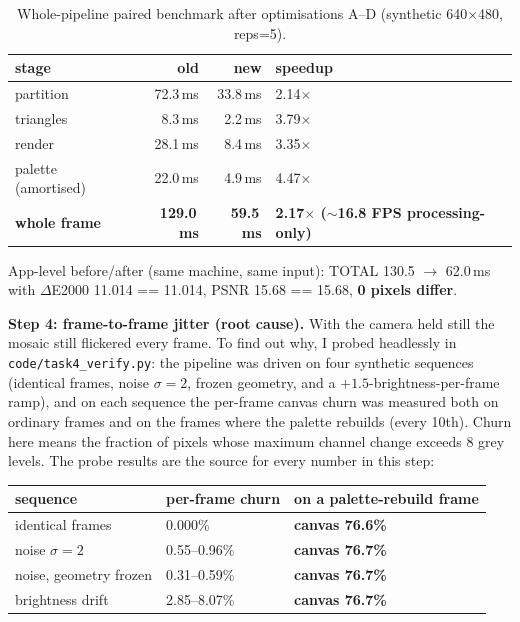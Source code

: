 \documentclass[11pt,a4paper]{article}
\begin{document}
\begin{table}[htbp]
\centering
\begin{tabular}{@{}l r r l@{}}
\toprule
\textbf{stage} & \textbf{old} & \textbf{new} & \textbf{speedup}\\
\midrule
partition           & 72.3\,ms & 33.8\,ms & 2.14$\times$ \\
triangles           & 8.3\,ms  & 2.2\,ms  & 3.79$\times$ \\
render              & 28.1\,ms & 8.4\,ms  & 3.35$\times$ \\
palette (amortised) & 22.0\,ms & 4.9\,ms  & 4.47$\times$ \\
\midrule
\textbf{whole frame} & \textbf{129.0\,ms} & \textbf{59.5\,ms} & \textbf{2.17$\times$ ($\sim$16.8 FPS processing-only)} \\
\bottomrule
\end{tabular}
\caption{Whole-pipeline paired benchmark after optimisations A--D (synthetic
640$\times$480, reps=5).}
\label{tab:pipeline}
\end{table}

App-level before/after (same machine, same input): TOTAL 130.5 $\rightarrow$ 62.0\,ms
with $\Delta$E2000 11.014 == 11.014, PSNR 15.68 == 15.68, \textbf{0 pixels
differ}.

\textbf{Step 4: frame-to-frame jitter (root cause).} With the camera held still
the mosaic still flickered every frame. To find out why, I probed headlessly in
\texttt{code/task4\_verify.py}: the pipeline was driven on four synthetic
sequences (identical frames, noise $\sigma=2$, frozen geometry, and a
$+1.5$-brightness-per-frame ramp), and on each sequence the per-frame canvas
churn was measured both on ordinary frames and on the frames where the palette
rebuilds (every 10th). Churn here means the fraction of pixels whose maximum
channel change exceeds 8 grey levels. The probe results are the source for every
number in this step:

\begin{table}[htbp]
\centering
\begin{tabular}{@{}l l l@{}}
\toprule
\textbf{sequence} & \textbf{per-frame churn} & \textbf{on a palette-rebuild frame}\\
\midrule
identical frames         & 0.000\%      & \textbf{canvas 76.6\%} \\
noise $\sigma=2$         & 0.55--0.96\%  & \textbf{canvas 76.7\%} \\
noise, geometry frozen   & 0.31--0.59\%  & \textbf{canvas 76.7\%} \\
brightness drift         & 2.85--8.07\%  & \textbf{canvas 76.7\%} \\
\bottomrule
\end{tabular}
\end{table}
\end{document}
